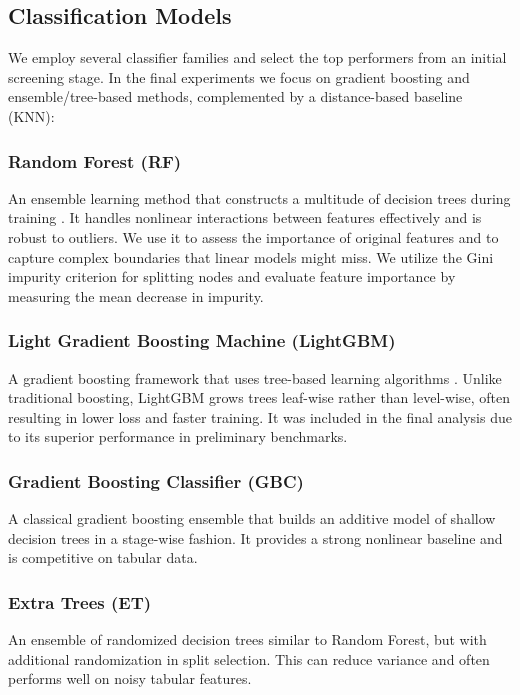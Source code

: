 \subsection{Classification Models}
We employ several classifier families and select the top performers from an initial screening stage. In the final experiments we focus on gradient boosting and ensemble/tree-based methods, complemented by a distance-based baseline (KNN):

\subsubsection{Random Forest (RF)}
An ensemble learning method that constructs a multitude of decision trees during training \cite{breiman2001random}. It handles nonlinear interactions between features effectively and is robust to outliers. We use it to assess the importance of original features and to capture complex boundaries that linear models might miss. We utilize the Gini impurity criterion for splitting nodes and evaluate feature importance by measuring the mean decrease in impurity.

\subsubsection{Light Gradient Boosting Machine (LightGBM)}
A gradient boosting framework that uses tree-based learning algorithms \cite{lightgbm}. Unlike traditional boosting, LightGBM grows trees leaf-wise rather than level-wise, often resulting in lower loss and faster training. It was included in the final analysis due to its superior performance in preliminary benchmarks.

\subsubsection{Gradient Boosting Classifier (GBC)}
A classical gradient boosting ensemble that builds an additive model of shallow decision trees in a stage-wise fashion. It provides a strong nonlinear baseline and is competitive on tabular data.

\subsubsection{Extra Trees (ET)}
An ensemble of randomized decision trees similar to Random Forest, but with additional randomization in split selection. This can reduce variance and often performs well on noisy tabular features.

